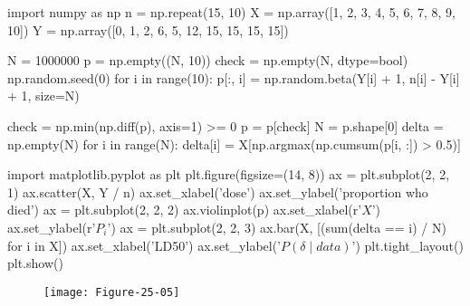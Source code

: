 \begin{python}
import numpy as np
n = np.repeat(15, 10)
X = np.array([1, 2, 3, 4, 5, 6, 7, 8, 9, 10])
Y = np.array([0, 1, 2, 6, 5, 12, 15, 15, 15, 15])
\end{python}

\begin{python}
N = 1000000
p = np.empty((N, 10))
check = np.empty(N, dtype=bool)
np.random.seed(0)
for i in range(10):
    p[:, i] = np.random.beta(Y[i] + 1, n[i] - Y[i] + 1, size=N)
    
check = np.min(np.diff(p), axis=1) >= 0
p = p[check]
N = p.shape[0]
delta = np.empty(N)
for i in range(N):
    delta[i] = X[np.argmax(np.cumsum(p[i, :]) > 0.5)]
\end{python}

\begin{python}
import matplotlib.pyplot as plt
plt.figure(figsize=(14, 8))
ax = plt.subplot(2, 2, 1)
ax.scatter(X, Y / n)
ax.set_xlabel('dose')
ax.set_ylabel('proportion who died')
ax = plt.subplot(2, 2, 2)
ax.violinplot(p)
ax.set_xlabel(r'$X$')
ax.set_ylabel(r'$P_{i}$')
ax = plt.subplot(2, 2, 3)
ax.bar(X, [(sum(delta == i) / N) for i in X])
ax.set_xlabel('LD50')
ax.set_ylabel('$P(\delta \;|\; data)$')
plt.tight_layout()
plt.show()
\end{python}

\begin{figure}[H]
\centering
\texttt{[image: Figure-25-05]}
\end{figure}


